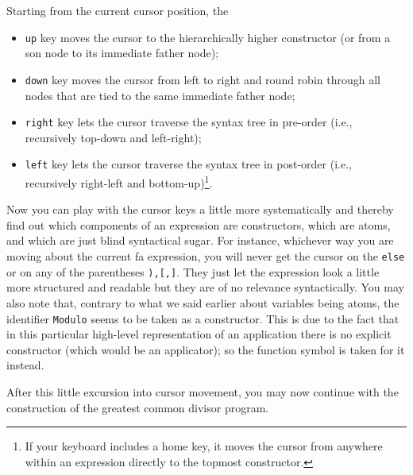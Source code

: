 Starting from the current cursor position, the
\begin{itemize}
\item {\tt up} key moves the cursor to the hierarchically higher constructor
(or from a {\mys son node} to its immediate {\mys father node});
\item {\tt down} key moves the cursor from left to right and round robin
through all nodes that are tied to the same immediate father node; 
\item {\tt right} key lets the cursor traverse the syntax tree in
 {\mys pre-order} (i.e., recursively top-down and left-right);
\item {\tt left} key lets the cursor traverse the syntax tree in {\mys post-order}
(i.e., recursively right-left and bottom-up)\footnote{If your keyboard includes a {\mys home key}, it moves the cursor from anywhere within an expression
directly to the topmost constructor.}.
\end{itemize}

Now you can play with the cursor keys a little more systematically and
thereby find out which components of an expression are constructors,
which are atoms, and which are just blind syntactical sugar. For instance,
whichever way you are moving about the current {\sc fa} expression, you will never
get the cursor on the {\tt else} or on any of the parentheses {\tt ),[,]}. They
just let the expression look a little more structured and readable
 but they are
of no relevance syntactically.  You may also note that, contrary to what
we said earlier about variables being atoms, the identifier {\tt Modulo}
seems to be taken as  a constructor.
This is due to the fact that in this particular high-level representation of an 
application there is no explicit constructor (which would be an applicator); so the function symbol is taken for it instead.

After this
little excursion into cursor movement, you may now
 continue with the construction of the greatest common divisor
program. 

